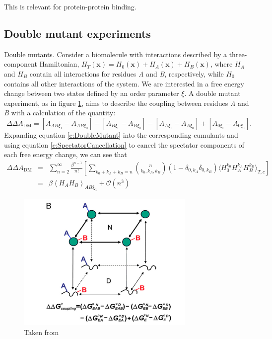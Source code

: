 \documentclass[%
 preprint,
 amsmath,amssymb,
 aps,
]{revtex4-1}
\renewcommand{\vec}[1]{{\mathbf{#1}}}
\begin{document}
 This is relevant for protein-protein binding. 
 
 
 
 \subsection{Double mutant experiments}
 Double mutants.  Consider a biomolecule with interactions described by a three-component Hamiltonian,
 $H_{T} \left( \vec{x} \right) = H_0 \left( \vec{x} \right) + H_A \left( \vec{x} \right) + H_B \left( \vec{x} \right)$, where $H_A$ and $H_B$ contain all interactions for residues \emph{A} and \emph{B}, respectively, while $H_0$ contains all other interactions of the system.   We are interested in a free energy change between two states defined by an order parameter $\xi$.  A double mutant experiment, as in figure \ref{f:DoubleMutant}, aims to describe the coupling between residues \emph{A} and \emph{B} with a calculation of the quantity:
 \begin{equation}
 \Delta \Delta A_{\text{DM}} =  \left[ A_{AB\xi_1} - A_{AB\xi_0} \right] - \left[ A_{B\xi_1} - A_{B\xi_0} \right]
 - \left[ A_{A\xi_1} - A_{A\xi_0} \right] + \left[ A_{0\xi_1} - A_{0\xi_0} \right]. 
 \label{e:DoubleMutant}
 \end{equation}
 Expanding equation \ref{e:DoubleMutant} into the corresponding cumulants and using equation \ref{e:SpectatorCancellation} to cancel the spectator components of each free energy change, we can see that
 \begin{eqnarray}
  \Delta \Delta A_{\text{DM}} &=& 
   \sum_{n=2}^{\infty}  \frac{\beta^{n-1}}{n!} 
\left[
 \sum_{k_0+k_A+k_B=n} 
{ n \choose k_0,k_A,k_B}  \left( 1- \delta_{0,k_A} \delta_{0,k_B} \right) \langle  H_0^{k_0} H_A^{k_A} H_B^{k_B} 
\rangle_{T,c} \right]
\nonumber \\ 
& = & 
\beta \left \langle H_A H_B \right \rangle_{AB\vec{\xi}_1} + \mathcal{O} \left( n^3 \right) 
 \label{e:DoubleMutantExpansion}
 \end{eqnarray}
 
\begin{figure}
 \centering
  \includegraphics[width=8.6cm]{doubleMutant.png}
\caption{\label{f:DoubleMutant} { Taken from \cite{Cho2014} }}
\end{figure}
\end{document}
